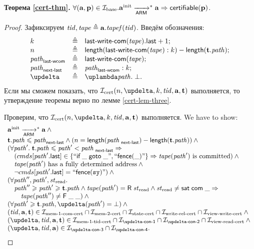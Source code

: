 \noindent
{\bf Теорема \ref{cert-thm}.}
$\forall (\mathbf{a}, \mathbf{p}) \in \mathcal{I}_{\textup{\rm base}}. \mathbf{a}^{\rm init} \xrightarrow[\mathsf{ARM}]{}^{*} \mathbf{a} \Rightarrow \mathsf{certifiable}(\mathbf{p})$.
\begin{proof}%
  Зафиксируем $\mathit{tid}, \mathit{tape} \triangleq \mathbf{a}.\mathit{tapef}(\mathit{tid})$. Введём обозначения:
  \[\begin{array}{l l l}
    k & \triangleq & \lastInstr{\lastCommittedWrite(\tape)} + 1; \\
    n & \triangleq & \length(\lastCommittedWrite(\tape):k) - \length(\tT.\cpath); \\
    \cpath_{\textup{\sf last-wcom}} & \triangleq & \lastCommittedWrite(\tape); \\
    \cpath_{\textup{\sf next-last}} & \triangleq & \cpath_{\textup{\sf last-wcom}}:k; \\
    \delta & \triangleq & \lambda \cpath. \; \bot. \\
  \end{array}\]
  Если мы сможем показать, что $\invCert(n, \delta, k, \tId, \aT, \tT)$
  выполняется, то утверждение теоремы верно по лемме \ref{cert-lem-three}.

  Проверим, что $\invCert(n, \delta, k, \tId, \aT, \tT)$ выполняется.
  We have to show:
  \[\begin{array}{l}
    \ainit \armStepP^{*} \aT \land {} \\
    \tT.\cpath \le \cpath_{\textup{\sf next-last}} \land (n = \length(\cpath_{\textup{\sf next-last}}) - \length(\tT.\cpath)) \land {} \\
    (\forall \cpath'. \; \tT.\cpath \le \cpath' < \cpath_{\textup{\sf next-last}} \Rightarrow \\
    \quad (\Cprom[\lastInstr{\cpath'}] \in \{``\ifGotoInst{\_}{\_}", ``\fenceInst{\_}"\} \Rightarrow
             \tape(\cpath') \text{ is committed}) \land {} \\
    \quad \tape(\cpath') \text{ has a fully determined address} \land {} \\
    \quad \lnot \Cprom[\lastInstr{\cpath'}] = ``\fenceInst{\SY}") \land {} \\
    (\forall \cpath'', \cpath', \Rstate. \\
    \quad \cpath'' \ge \cpath' \ge \tT.\cpath \land \tape(\cpath') = \tapeRead{\Rstate} \land
       \Rstate \not = \tapeSatisfied{\Committed}{\_} \Rightarrow \\
    \qquad \tape(\cpath'') \not = \tapeFence{\_}{\_}) \land {} \\
    (\forall \cpath' \ge \tT.\cpath, \delta(\cpath') = \bot) \land {} \\
    (\tId, \aT, \tT) \in \invMemOneCERT \cap \invMemTwoCERT \cap \invStateCERT \cap \invViewRelCERT \cap \invViewWriteCERT \land {} \\
    (\delta, \tId, \aT, \tT) \in \invMemZeroCERT \cap \invDeltaDefOne \cap \invDeltaDefTwo \cap
               \invViewReadCERT \land {} \\
    (\delta, \tId, \aT) \in \invDeltaDefThree \cap \invDeltaDefFour. \\
  \end{array}\]


\end{proof}
